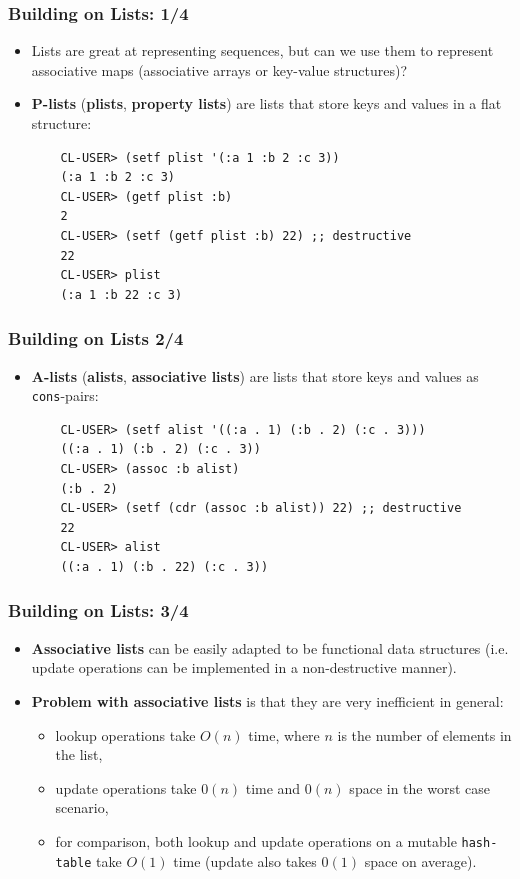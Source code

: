 \documentclass{beamer}
\begin{document}
\begin{frame}[fragile]
  \frametitle{Building on Lists: 1/4}
  \begin{itemize}
  \item Lists are great at representing sequences, but can we use them to
    represent associative maps (associative arrays or key-value structures)?
  \item \textbf{P-lists} (\textbf{plists}, \textbf{property lists}) are lists
    that store keys and values in a flat structure:
\begin{verbatim}
    CL-USER> (setf plist '(:a 1 :b 2 :c 3))
    (:a 1 :b 2 :c 3)
    CL-USER> (getf plist :b)
    2
    CL-USER> (setf (getf plist :b) 22) ;; destructive
    22
    CL-USER> plist
    (:a 1 :b 22 :c 3)
\end{verbatim}
  \end{itemize}
\end{frame}

\begin{frame}[fragile]
  \frametitle{Building on Lists 2/4}
  \begin{itemize}
  \item \textbf{A-lists} (\textbf{alists}, \textbf{associative lists}) are lists
    that store keys and values as \texttt{cons}-pairs:
\begin{verbatim}
    CL-USER> (setf alist '((:a . 1) (:b . 2) (:c . 3)))
    ((:a . 1) (:b . 2) (:c . 3))
    CL-USER> (assoc :b alist)
    (:b . 2)
    CL-USER> (setf (cdr (assoc :b alist)) 22) ;; destructive
    22
    CL-USER> alist
    ((:a . 1) (:b . 22) (:c . 3))
\end{verbatim}
  \end{itemize}
\end{frame}

\begin{frame}[fragile]
  \frametitle{Building on Lists: 3/4}
  \begin{itemize}
  \item \textbf{Associative lists} can be easily adapted to be functional data
    structures (i.e. update operations can be implemented in a non-destructive
    manner).
  \item \textbf{Problem with associative lists} is that they are very
    inefficient in general:
    \begin{itemize}
    \item lookup operations take $O(n)$ time, where $n$ is the number of
      elements in the list,
    \item update operations take $0(n)$ time and $0(n)$ space in the worst case
      scenario,
    \item for comparison, both lookup and update operations on a mutable
      \texttt{hash-table} take $O(1)$ time (update also takes $0(1)$
      space on average).
    \end{itemize}
  \end{itemize}
\end{frame}
\end{document}
